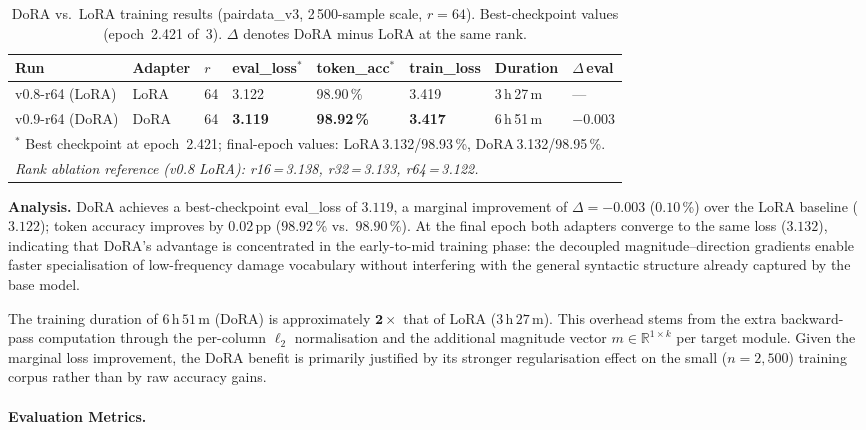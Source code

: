 \documentclass[onecolumn]{article}
\begin{document}
\begin{table}[h]
\centering
\caption{DoRA vs.\ LoRA training results (pairdata\_v3, 2\,500-sample scale, $r=64$).
         Best-checkpoint values (epoch~2.421 of~3).
         $\Delta$ denotes DoRA minus LoRA at the same rank.}
\label{tab:u8_results}
\small
\begin{tabular}{llllllll}
\toprule
\textbf{Run} & \textbf{Adapter} & $r$ & \textbf{eval\_loss$^*$} & \textbf{token\_acc$^*$} & \textbf{train\_loss} & \textbf{Duration} & $\Delta$\,eval \\
\midrule
v0.8-r64 (LoRA)  & LoRA & 64 & 3.122          & 98.90\,\%          & 3.419 & 3\,h\,27\,m & --- \\
v0.9-r64 (DoRA)  & DoRA & 64 & \textbf{3.119} & \textbf{98.92\,\%} & \textbf{3.417} & 6\,h\,51\,m & $-0.003$ \\
\midrule
\multicolumn{8}{l}{$^*$ Best checkpoint at epoch~2.421; final-epoch values: LoRA\,3.132/98.93\,\%, DoRA\,3.132/98.95\,\%.} \\
\multicolumn{8}{l}{\textit{Rank ablation reference (v0.8 LoRA): r16\,=\,3.138, r32\,=\,3.133, r64\,=\,3.122.}} \\
\bottomrule
\end{tabular}
\end{table}

\noindent
\textbf{Analysis.}
DoRA achieves a best-checkpoint eval\_loss of $3.119$, a marginal improvement
of $\Delta = -0.003$ ($0.10$\,\%) over the LoRA baseline ($3.122$);
token accuracy improves by $0.02$\,pp ($98.92$\,\% vs.\ $98.90$\,\%).
At the final epoch both adapters converge to the same loss ($3.132$),
indicating that DoRA's advantage is concentrated in the early-to-mid training
phase: the decoupled magnitude--direction gradients enable faster specialisation
of low-frequency damage vocabulary without interfering with the general
syntactic structure already captured by the base model.

The training duration of $6$\,h\,$51$\,m (DoRA) is approximately
$\mathbf{2\times}$ that of LoRA ($3$\,h\,$27$\,m).
This overhead stems from the extra backward-pass computation through
the per-column $\ell_2$ normalisation and the additional magnitude
vector $m \in \mathbb{R}^{1 \times k}$ per target module.
Given the marginal loss improvement, the DoRA benefit is primarily
justified by its stronger regularisation effect on the small
($n{=}2{,}500$) training corpus rather than by raw accuracy gains.

\paragraph{Evaluation Metrics.}
\end{document}
